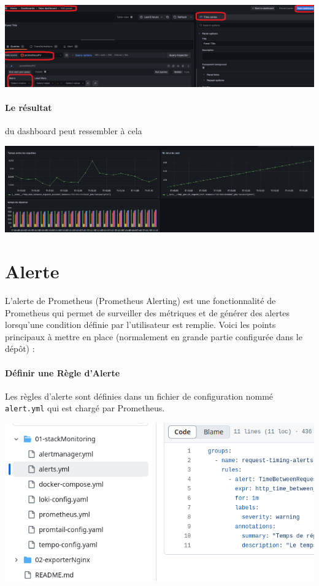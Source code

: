 \documentclass[french, 12pt]{article}%
\begin{document}
\begin{center}
\includegraphics[scale=0.5]{./ressource/NewPanel.png}
\end{center}


\paragraph{Le résultat} du dashboard peut ressembler à cela

\begin{center}
\includegraphics[scale=0.35]{./ressource/exPanel.png}
\end{center}


\section{Alerte}

L'alerte de Prometheus (Prometheus Alerting) est une fonctionnalité de Prometheus qui permet de surveiller des métriques et de générer des alertes lorsqu'une condition définie par l'utilisateur est remplie. Voici les points principaux à mettre en place (normalement en grande partie configurée dans le dépôt)  : 

\paragraph{Définir une Règle d'Alerte}
Les règles d'alerte sont définies dans un fichier de configuration nommé  \verb?alert.yml? qui est chargé par Prometheus. 

\begin{center}
\includegraphics[scale=0.4]{./ressource/depot_alert_yml}
\end{center}
\end{document}
